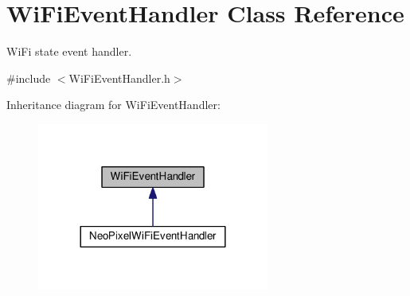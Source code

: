 \hypertarget{class_wi_fi_event_handler}{}\section{Wi\+Fi\+Event\+Handler Class Reference}
\label{class_wi_fi_event_handler}


Wi\+Fi state event handler.  




{\ttfamily \#include $<$Wi\+Fi\+Event\+Handler.\+h$>$}



Inheritance diagram for Wi\+Fi\+Event\+Handler\+:\nopagebreak
\begin{figure}[H]
\begin{center}
\leavevmode
\includegraphics[width=216pt]{class_wi_fi_event_handler__inherit__graph}
\end{center}
\end{figure}
